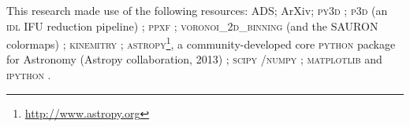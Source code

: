 \documentclass[fleqn,usenatbib,useAMS]{mnras}
\begin{document}
This research made use of the following resources: ADS; ArXiv; \textsc{py3d} \citep{Sanchez2011, Husemann2013, Husemann2014}; \textsc{p3d} (an \textsc{idl} IFU reduction pipeline) \citep{Sandin2010, Sandin2011}; \textsc{ppxf} \citep{Cappellari2004}; \textsc{voronoi\_2d\_binning} (and the SAURON colormaps) \citep{Cappellari2003}; \textsc{kinemitry} \citep{Krajnovi2006}; \textsc{astropy}\footnote{\url{http://www.astropy.org}}, a community-developed core \textsc{python} package for Astronomy (Astropy collaboration, 2013) \citep{TheAstropyCollaboration2013}; \textsc{scipy} \citep{Oliphant2007, Millman2011}/\textsc{numpy} \citep{VanderWalt2011}; \textsc{matplotlib} \citep{Hunter2007} and \textsc{ipython} \citep{Perez2007}. %



{}

\appendix


\end{document}
